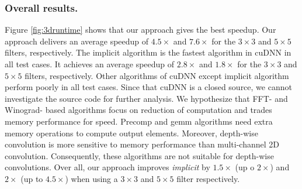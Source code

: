 \subsubsection{Overall results.}
Figure \ref{fig:3druntime} shows that our approach gives the best speedup. Our approach delivers an average speedup of $4.5\times$ and
$7.6\times$ for the $3 \times 3$ and $5 \times 5$ filters, respectively. The implicit algorithm is the fastest algorithm in cuDNN in all
test cases. It achieves an average speedup of $2.8\times$ and $1.8\times$ for the $3 \times 3$ and $5 \times 5$ filters, respectively.
Other algorithms of cuDNN except implicit algorithm perform poorly in all test cases. Since that cuDNN is a closed source, we cannot
investigate the source code for further analysis. We hypothesize that FFT- and Winograd- based algorithms focus on reduction of computation
and trades memory performance for speed. Precomp and gemm algorithms need extra memory operations to compute output elements. Moreover,
depth-wise convolution is more sensitive to memory performance than multi-channel 2D convolution. Consequently, these algorithms are not suitable for
depth-wise convolutions. Over all, our approach improves \emph{implicit} by $1.5\times$ (up o $2\times$) and $2\times$ (up to $4.5\times$)
when using a $3 \times 3$ and $5 \times 5$ filter respectively.

%

